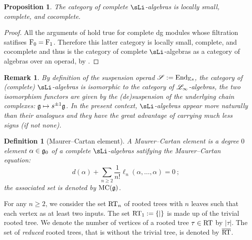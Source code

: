 \documentclass[twoside, 10pt]{amsart}
\newtheorem{remark}[lemma]{Remark}
\newtheorem{definition}[lemma]{Definition}
\newtheorem{proposition}[lemma]{Proposition}
\begin{document}
 \begin{proposition}\label{prop:CatCocomp}
 The category of complete $\sLi$-algebras is locally small, complete, and cocomplete. 
 \end{proposition}
 
\begin{proof}
All the arguments of  \cite[Lemma~4]{DotsenkoShadrinVallette18} hold true for complete dg modules whose filtration satifises $\mathrm{F}_0=\mathrm{F}_1$. Therefore this latter category is locally small, complete, and cocomplete and thus is the category of complete $\sLi$-algebras as a category of algebras over an operad, by \cite[Theorem~1]{DotsenkoShadrinVallette18}.
\end{proof}
 
\begin{remark} 
By definition of  the suspension operad $\mathscr{S}:=\mathrm{End}_{\mathbb{K} s}$, the category of (complete)  $\sLi$-algebras is isomorphic to the category of $\mathscr{L}_\infty$-algebras, the two isomorphism functors are given by the (de)suspension of the underlying chain complexes: $\mathfrak{g} \mapsto s^{\pm 1}\mathfrak{g}$. In the present context, $\sLi$-algebras appear more naturally than their analogues and they have the great advantage of carrying much less signs (if not none).
\end{remark}

\begin{definition}[Maurer--Cartan element]
A \emph{Maurer--Cartan element} is a degree $0$ element $\alpha\in \mathfrak{g}_0$ of a complete $\sLi$-algebras satifying the Maurer--Cartan equation:
\[
d(\alpha)+\sum_{n\geqslant 2} {\textstyle \frac{1}{n!}}\ell_n(\alpha, \ldots, \alpha)=0 \ ;
\]
the associated set is denoted by $\mathrm{MC}(\mathfrak{g})$.
\end{definition}

For any $n\geqslant 2$, we consider the set $\mathrm{RT}_n$ of rooted trees with $n$ leaves such that each vertex as at least two inputs. The set $\mathrm{RT}_1:=\{|\}$ is made up of the trivial rooted tree. We denote the number of vertices of a rooted tree $\tau\in\mathrm{RT}$ by $|\tau|$. The set of \emph{reduced} rooted trees, that is without the trivial tree, is denoted by $\overline{\mathrm{RT}}$. 

\end{document}
